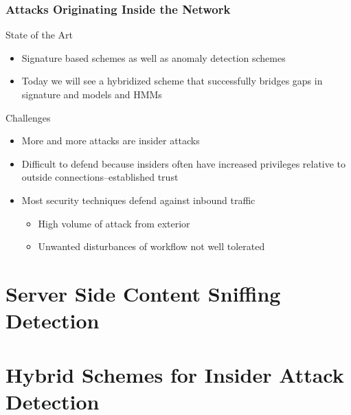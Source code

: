 \documentclass[10pt,mathserif]{beamer}
\begin{document}
\begin{frame}
  \frametitle{Attacks Originating Inside the Network}
  \begin{block}{State of the Art}
    \begin{itemize}
    \item Signature based schemes as well as anomaly detection schemes
    \item Today we will see a hybridized scheme that successfully
      bridges gaps in signature and models and HMMs
    \end{itemize}
  \end{block}

  \begin{block}{Challenges}
    \begin{itemize}
    \item More and more attacks are insider attacks
    \item Difficult to defend because insiders often have increased
      privileges relative to outside connections--established trust
    \item Most security techniques defend against inbound traffic
      \begin{itemize}
      \item High volume of attack from exterior
      \item Unwanted disturbances of workflow not well tolerated
      \end{itemize}
    \end{itemize}
  \end{block}
\end{frame}

\section{Server Side Content Sniffing Detection}

\section{Hybrid Schemes for Insider Attack Detection}
\end{document}
